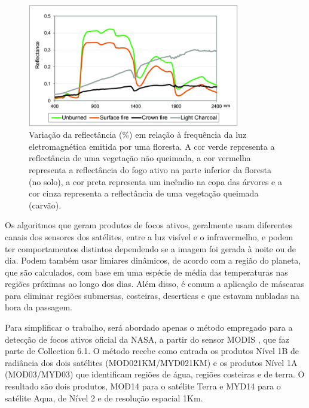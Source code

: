 \documentclass[cic,tc]{iiufrgs}
\begin{document}
\begin{figure}
    \caption{Variação da reflectância (\%) em relação à frequência da luz eletromagnética emitida por uma floresta. A cor verde representa a reflectância de uma vegetação não queimada, a cor vermelha representa a reflectância do fogo ativo na parte inferior da floresta (no solo), a cor preta representa um incêndio na copa das árvores e a cor cinza representa a reflectância de uma vegetação queimada (carvão).}
    \begin{center}
        \includegraphics[width=25em]{Reflectance-spectra-for-unburned-vegetation-canopy-and-fires-affecting-different}
    \end{center}
    \label{fig:reflectancia_espectral}
\end{figure}

Os algoritmos que geram produtos de focos ativos, geralmente usam diferentes canais dos sensores dos satélites, entre a luz visível e o infravermelho, e podem ter comportamentos distintos dependendo se a imagem foi gerada à noite ou de dia. Podem também usar limiares dinâmicos, de acordo com a região do planeta, que são calculados, com base em uma espécie de média das temperaturas nas regiões próximas ao longo dos dias. Além disso, é comum a aplicação de máscaras para eliminar regiões submersas, costeiras, deserticas e que estavam nubladas na hora da passagem. \par

Para simplificar o trabalho, será abordado apenas o método empregado para a detecção de focos ativos oficial da NASA, a partir do sensor MODIS \citep{GIGLIO2016}, que faz parte de Collection 6.1. O método recebe como entrada os produtos Nível 1B de radiância dos dois satélites (MOD021KM/MYD021KM) e os produtos Nível 1A (MOD03/MYD03) que identificam regiões de água, regiões costeiras e de terra. O resultado são dois produtos, MOD14 para o satélite Terra e MYD14 para o satélite Aqua, de Nível 2 e de resolução espacial 1Km.
\end{document}
